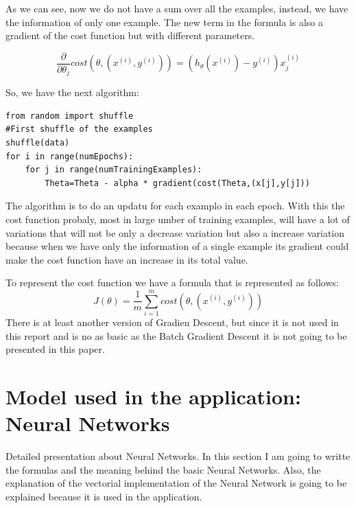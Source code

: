 \documentclass[12pt]{article}
\begin{document}
As we can see, now we do not have a sum over all the examples, instead, we have the information of only one example. The new term in the formula is also a gradient of the cost function but with different parameters.

\begin{equation}
 \frac{\partial}{\partial\theta_{j}}cost(\theta,(x^{(i)},y^{(i)}))= (h_{\theta}(x^{(i)})-y^{(i)})x_{j}^{(i)}
\end{equation}

So, we have the next algorithm:
\begin{lstlisting}
from random import shuffle
#First shuffle of the examples
shuffle(data)
for i in range(numEpochs):
	for j in range(numTrainingExamples):
		Theta=Theta - alpha * gradient(cost(Theta,(x[j],y[j]))
\end{lstlisting}

The algorithm is to do an updatu for each examplo in each epoch. With this the cost function probaly, most in large umber of training examples, will have a lot of variations that will not be only a decrease variation but also a increase variation because when we have only the information of a single example its gradient could make the cost function have an increase in its total value.

To represent the cost function we have a formula that is represented as follows:
\begin{equation}
  J(\theta)=\frac{1}{m} \displaystyle\sum_{i=1}^{m}cost(\theta,(x^{(i)},y^{(i)}))
\end{equation}
There is at least another version of Gradien Descent, but since it is not used in this report and is no as basic as the Batch Gradient Descent it is not going to be presented in this paper.

\section{Model used in the application: Neural Networks}
Detailed presentation about Neural Networks. In this section I am going to writte the formulas and the meaning behind the basic Neural Networks. Also, the explanation of the vectorial implementation of the Neural Network is going to be explained because it is used in the application.
\end{document}
